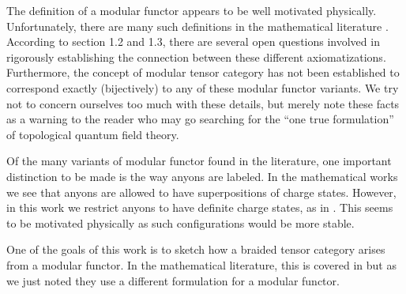 \documentclass[aps, prl, letterpaper, twocolumn, superscriptaddress, notitlepage, 10pt]{revtex4-1}
\begin{document}
The definition of a modular functor appears to
be well motivated physically.
Unfortunately, there are many such definitions
in the mathematical literature 
\cite{Walker1991,Turaev1994,Bakalov2001,Tillmann1998}.
According to \cite{Bartlett2015} section 1.2 and 1.3,
there are several open questions involved in 
rigorously establishing the connection between these different axiomatizations.
Furthermore, the concept of modular tensor category 
has not been established to correspond exactly
(bijectively) to any of these modular functor variants. 
We try not to concern ourselves too much with these details, 
but merely note these facts as a warning to the reader
who may go searching for the ``one true formulation'' of
topological quantum field theory.

Of the many variants of modular functor found in the literature,
one important distinction to be made is
the way anyons are labeled.
In the mathematical works \cite{Turaev1994, Bakalov2001, Tillmann1998} 
we see that anyons are allowed to have superpositions
of charge states. 
However, in this work we restrict anyons to have
definite charge states, as in \cite{Walker1991,Freedman2002simulation,Beverland2014}. 
This seems to be motivated physically as such configurations
would be more stable. %

One of the goals of this work is to sketch how a 
braided tensor category arises from a modular functor.
In the mathematical literature,
this is covered in \cite{Turaev1994,Tillmann1998,Bakalov2001}
but as we just noted they use a different formulation for a
modular functor.


\end{document}
